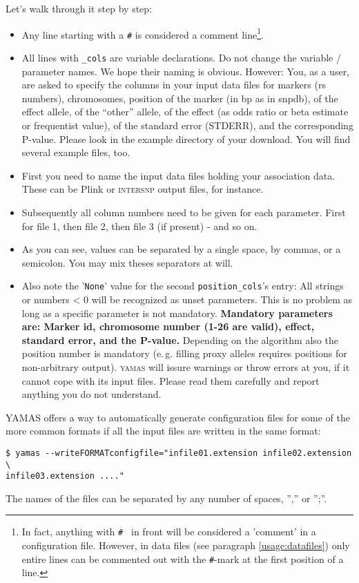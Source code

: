 Let's walk through it step by step:
\begin{itemize}
 \item Any line starting with a \verb+#+ is considered a comment line\footnote{In fact, anything with \texttt{\#
} in front will be considered a 'comment' in a configuration file. However, in data files (see paragraph \ref{usage:datafiles}) only entire lines can be commented out with the \texttt{\#}-mark at the first position of a line.}.
 \item All lines with \verb+_cols+ are variable declarations. Do not change the variable / parameter names. We hope their naming is obvious. However: You, as a user, are asked to specify the columns in your input data files for markers (rs numbers), chromosomes, position of the marker (in bp as in snpdb), of the effect allele, of the ``other'' allele, of the effect (as odds ratio or beta estimate or frequentist value), of the standard error (STDERR), and the corresponding P-value. Please look in the example directory of your download. You will find several example files, too.

 \item First you need to name the input data files holding your association data. These can be Plink \citep{Purcell2007} or \textsc{intersnp} \cite{Herold2009} output files, for instance.
 \item Subsequently all column numbers need to be given for each parameter. First for file 1, then file 2, then file 3 (if present) - and so on.
 \item As you can see, values can be separated by a single space, by commas, or a semicolon. You may mix theses separators at will.
 \item Also note the '\texttt{None}' value for the second \verb+position_cols+'s entry: All strings or numbers < 0 will be recognized as unset parameters. This is no problem as long as a specific parameter is not mandatory. \textbf{Mandatory parameters are: Marker id, chromosome number (1-26 are valid), effect, standard error, and the P-value.} Depending on the algorithm also the position number is mandatory (e.\,g. filling proxy alleles requires positions for non-arbitrary output). \textsc{yamas} will issure warnings or throw errors at you, if it cannot cope with its input files. Please read them carefully and report anything you do not understand.
\end{itemize}

YAMAS offers a way to automatically generate configuration files for some of the more common formats if all the input files are written in the same format:
\begin{lstlisting}[style=shell]
$ yamas --writeFORMATconfigfile="infile01.extension infile02.extension \
infile03.extension ...."
\end{lstlisting}
The names of the files can be separated by any number of spaces, '','' or '';''.

